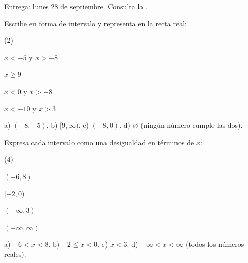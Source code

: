 \documentclass[11pt]{article}
\begin{document}
\encabezado

\begin{instrucciones}
Entrega: lunes 28 de septiembre. Consulta la .
\end{instrucciones}

\begin{preguntas}

\pregunta Escribe en forma de intervalo y representa en la recta real:
\begin{opciones*}(2)
  \item $x < -5$ y $x > -8$
  \item $x \ge 9$
  \item $x < 0$ y $x > -8$
  \item $x < -10$ y $x > 3$
\end{opciones*}
\espacio{5cm}
\begin{solucion}
a) $(-8, -5)$. b) $[9, \infty)$. c) $(-8, 0)$. d) $\varnothing$ (ningún número cumple las dos).
\end{solucion}

\pregunta Expresa cada intervalo como una desigualdad en términos de $x$:
\begin{opciones*}(4)
  \item $(-6, 8)$
  \item $[-2, 0)$
  \item $(-\infty, 3)$
  \item $(-\infty, \infty)$
\end{opciones*}
\espacio{2.5cm}
\begin{solucion}
a) $-6 < x < 8$. b) $-2 \le x < 0$. c) $x < 3$. d) $-\infty < x < \infty$ (todos los números
reales).
\end{solucion}

\end{preguntas}
\end{document}
